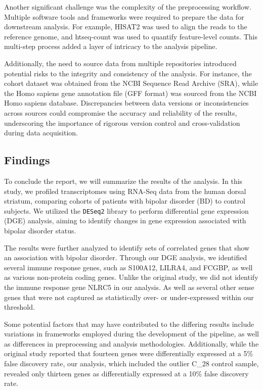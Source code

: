 \documentclass{article}
\begin{document}
Another significant challenge was the complexity of the preprocessing workflow. Multiple software tools and frameworks were required to prepare the data for downstream analysis. For example, HISAT2 was used to align the reads to the reference genome, and htseq-count was used to quantify feature-level counts. This multi-step process added a layer of intricacy to the analysis pipeline.

Additionally, the need to source data from multiple repositories introduced potential risks to the integrity and consistency of the analysis. For instance, the cohort dataset was obtained from the NCBI Sequence Read Archive (SRA), while the Homo sapiens gene annotation file (GFF format) was sourced from the NCBI Homo sapiens database. Discrepancies between data versions or inconsistencies across sources could compromise the accuracy and reliability of the results, underscoring the importance of rigorous version control and cross-validation during data acquisition.

\subsection{Findings}
To conclude the report, we will summarize the results of the analysis. In this study, we profiled transcriptomes using RNA-Seq data from the human dorsal striatum, comparing cohorts of patients with bipolar disorder (BD) to control subjects. We utilized the \texttt{DESeq2} library to perform differential gene expression (DGE) analysis, aiming to identify changes in gene expression associated with bipolar disorder status. 

The results were further analyzed to identify sets of correlated genes that show an association with bipolar disorder. Through our DGE analysis, we identified several immune response genes, such as S100A12, LILRA4, and FCGBP, as well as various non-protein coding genes. Unlike the original study, we did not identify the immune response gene NLRC5 in our analysis. As well as several other sense genes that were not captured as statistically over- or under-expressed within our threshold.

Some potential factors that may have contributed to the differing results include variations in frameworks employed during the development of the pipeline, as well as differences in preprocessing and analysis methodologies. Additionally, while the original study \cite{pacifico2017transcriptome} reported that fourteen genes were differentially expressed at a 5\% false discovery rate, our analysis, which included the outlier C\_28 control sample, revealed only thirteen genes as differentially expressed at a 10\% false discovery rate. 

\pagebreak
\printbibliography[
heading=bibintoc,
title={Bibliography}]
\end{document}
